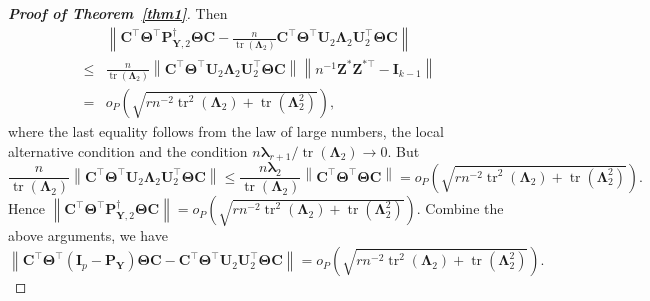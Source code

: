 \documentclass[12pt]{article} %
\DeclareMathOperator{\mytr}{tr}
\newcommand{\bZ}{\mathbf{Z}}
\newcommand{\bP}{\mathbf{P}}
\newcommand{\bY}{\mathbf{Y}}
\newcommand{\bC}{\mathbf{C}}
\newcommand{\bI}{\mathbf{I}}
\newcommand{\bU}{\mathbf{U}}
\newcommand{\bfsym}[1]{\ensuremath{\boldsymbol{#1}}}
\def\blambda {\bfsym {\lambda}}
\def\bLambda {\bfsym {\Lambda}}
\def\bTheta {\bfsym {\Theta}}
\theoremstyle{definition}
\begin{document}
\begin{appendices}
\begin{proof}[\textbf{Proof of Theorem~\ref{thm1}}]
Then
\begin{equation*}
    \begin{split}
        &\left\|
        \bC^\top \bTheta^\top \bP_{\bY,2}^\dagger \bTheta \bC
        -
        \frac{n}{\mytr(\bLambda_2)}\bC^\top \bTheta^\top \bU_{2}\bLambda_2\bU_{2}^\top \bTheta \bC
        \right\|
        \\
        \leq &
        \frac{n}{\mytr(\bLambda_2)}\left\|\bC^\top \bTheta^\top \bU_{2}\bLambda_2\bU_{2}^\top \bTheta \bC
        \right\|
        \left\|
        n^{-1}\bZ^*\bZ^{*\top}-\bI_{k-1}
        \right\|
        \\
=&    
o_P\left(
\sqrt{
        rn^{-2} \mytr^2 (\bLambda_2) + \mytr(\bLambda_2^2)
}
\right)
    ,
    \end{split}
\end{equation*}
where the last equality follows from the law of large numbers, the local alternative condition and the condition $n\blambda_{r+1}/\mytr(\bLambda_2)\to 0$.
But
\begin{equation*}
\frac{n}{\mytr(\bLambda_2)}
        \left\|
        \bC^\top \bTheta^\top \bU_{2}\bLambda_2\bU_{2}^\top \bTheta \bC
        \right\|
        \leq
\frac{n\blambda_2}{\mytr(\bLambda_2)}
        \left\|
        \bC^\top \bTheta^\top  \bTheta \bC
        \right\|
        =
o_P\left(
\sqrt{
        rn^{-2} \mytr^2 (\bLambda_2) + \mytr(\bLambda_2^2)
}
\right).
\end{equation*}
Hence
        $\left\|\bC^\top \bTheta^\top \bP_{\bY,2}^\dagger \bTheta \bC\right\|=
o_P\left(
\sqrt{
        rn^{-2} \mytr^2 (\bLambda_2) + \mytr(\bLambda_2^2)
}
\right)$.
Combine the above arguments, we have
\begin{equation}\label{lushang5}
        \left\|
\bC^\top \bTheta^\top (\bI_p-\bP_\bY)\bTheta \bC
        -
        \bC^\top \bTheta^\top \bU_2 \bU_2^\top \bTheta \bC
        \right\|
        =
o_P\left(
\sqrt{
        rn^{-2} \mytr^2 (\bLambda_2) + \mytr(\bLambda_2^2)
}
\right).
\end{equation}





\end{proof}
\end{appendices}
\end{document}
